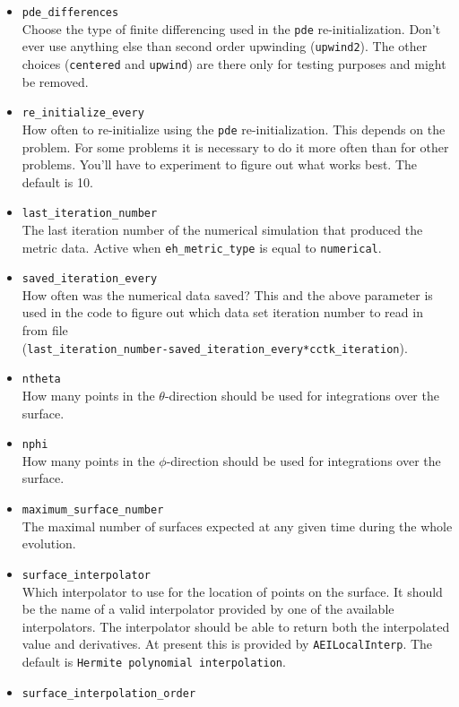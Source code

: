 \begin{itemize}
\item {\tt pde\_differences} \\
  Choose the type of finite differencing used in the {\tt pde}
  re-initialization. Don't ever use anything else than second order
  upwinding ({\tt upwind2}). The other choices ({\tt centered} and {\tt upwind})
  are there only for testing purposes and might be removed.
\item {\tt re\_initialize\_every} \\
  How often to re-initialize using the {\tt pde} re-initialization. This
  depends on the problem. For some problems it is necessary to do it more
  often than for other problems. You'll have to experiment to figure out
  what works best. The default is 10.
\item {\tt last\_iteration\_number} \\
  The last iteration number of the numerical
  simulation that produced the metric data. Active when {\tt eh\_metric\_type}
  is equal to {\tt numerical}.
\item {\tt saved\_iteration\_every} \\
  How often was the numerical data saved?
  This and the above parameter is used in the code to figure out which
  data set iteration number to read in from file \\
  ({\tt last\_iteration\_number-saved\_iteration\_every*cctk\_iteration}).
\item {\tt ntheta} \\
  How many points in the $\theta$-direction should be used for integrations
  over the surface.
\item {\tt nphi} \\
  How many points in the $\phi$-direction should be used for integrations
  over the surface.
\item {\tt maximum\_surface\_number} \\
  The maximal number of surfaces expected at any given time during the whole
  evolution.
\item {\tt surface\_interpolator} \\
  Which interpolator to use for the location of points on the surface. It
  should be the name of a valid interpolator provided by one of the available
  interpolators. The interpolator should be able to return both the
  interpolated value and derivatives. At present this is provided by
  {\tt AEILocalInterp}. The default is {\tt Hermite polynomial interpolation}.
\item {\tt surface\_interpolation\_order} \\

\end{itemize}

